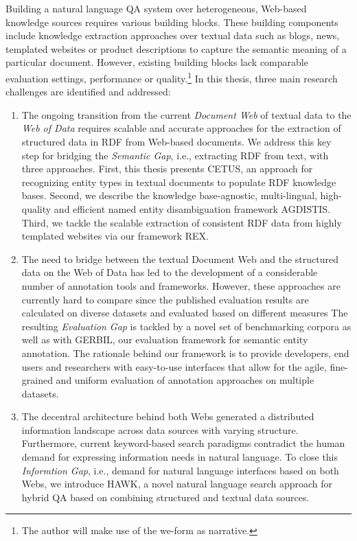 Building a natural language \ac{QA} system over heterogeneous, Web-based knowledge sources requires various building blocks.
These building components include knowledge extraction approaches over textual data such as blogs, news, templated websites or product descriptions to capture the semantic meaning of a particular document.
However, existing building blocks lack comparable evaluation settings, performance or quality.{\let\thefootnote\relax\footnote{The author will make use of the we-form as narrative.}}
In this thesis, three main research challenges are identified and addressed:
\begin{enumerate}[topsep=0pt,itemsep=-1ex,partopsep=1ex,parsep=1ex]
\item 
The ongoing transition from the current \emph{Document Web} of textual data to the \emph{Web of Data} requires scalable and accurate approaches for the extraction of structured data in \ac{RDF} from Web-based documents.
We address this key step for bridging the \emph{Semantic Gap}, i.e., extracting RDF from text, with three approaches.
First, this thesis presents CETUS, an approach for recognizing entity types in textual documents to populate RDF knowledge bases. 
Second, we describe the knowledge base-agnostic, multi-lingual, high-quality and efficient named entity disambiguation framework AGDISTIS.
Third, we tackle the scalable extraction of consistent \ac{RDF} data from highly templated websites via our framework REX.
\item 
The need to bridge between the textual Document Web and the structured data on the Web of Data has led to the development of a considerable number of annotation tools and frameworks. 
However, these approaches are currently hard to compare since the published evaluation results are calculated on diverse datasets and evaluated based on different measures
The resulting \emph{Evaluation Gap} is tackled by a novel set of benchmarking corpora as well as with GERBIL, our evaluation framework for semantic entity annotation. 
The rationale behind our framework is to provide developers, end users and researchers with easy-to-use interfaces that allow for the agile, fine-grained and uniform evaluation of annotation approaches on multiple datasets.
\item 
The decentral architecture behind both Webs generated a distributed information landscape across data sources with varying structure. 
Furthermore, current keyword-based search paradigms contradict the human demand for expressing information needs in natural language.
To close this \emph{Informtion Gap}, i.e., demand for natural language interfaces based on both Webs, we introduce HAWK, a novel natural language search approach for hybrid \ac{QA} based on combining structured and textual data sources.
\end{enumerate}
